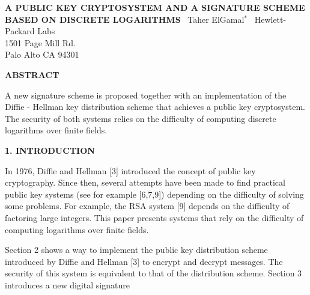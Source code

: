 \documentclass{article}
\begin{document}

\begin{center}
\textbf{A PUBLIC KEY CRYPTOSYSTEM AND A SIGNATURE SCHEME BASED ON DISCRETE LOGARITHMS}\
\vspace{1em}
Taher ElGamal$^*$\
\vspace{1em}
Hewlett-Packard Labs\\
1501 Page Mill Rd.\\
Palo Alto CA 94301
\end{center}

\textbf{ABSTRACT}

A new signature scheme is proposed together with an implementation of the Diffie - Hellman key distribution scheme that achieves a public key cryptosystem. The security of both systems relies on the difficulty of computing discrete logarithms over finite fields.

\textbf{1. INTRODUCTION}

In 1976, Diffie and Hellman [3] introduced the concept of public key cryptography. Since then, several attempts have been made to find practical public key systems (see for example [6,7,9]) depending on the difficulty of solving some problems. For example, the RSA system [9] depends on the difficulty of factoring large integers. This paper presents systems that rely on the difficulty of computing logarithms over finite fields.

Section 2 shows a way to implement the public key distribution scheme introduced by Diffie and Hellman [3] to encrypt and decrypt messages. The security of this system is equivalent to that of the distribution scheme. Section 3 introduces a new digital signature
\end{document}
